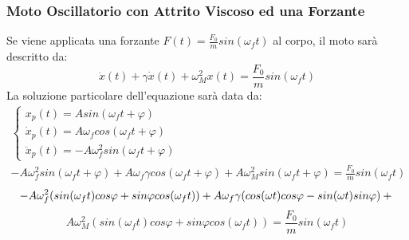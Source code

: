 \documentclass{article}
\numberwithin{equation}{subsection}
\begin{document}
\subsubsection{Moto Oscillatorio con Attrito Viscoso ed una Forzante}
Se viene applicata una forzante $F(t)=\displaystyle\frac{F_0}{m}sin(\omega_f t)$ 
al corpo, il moto sarà descritto da: 
\begin{equation}
    \ddot x(t)+\gamma\dot x(t)+\omega_M^{2}x(t)=\displaystyle\frac{F_0}{m}sin(\omega_f t)
\end{equation}
La soluzione particolare dell'equazione sarà data da:
\begin{gather}
    \begin{cases}
        x_p(t)=Asin(\omega_f t+\varphi)\\
        \dot x_p(t)=A\omega_fcos(\omega_f t+\varphi)\\
        \ddot x_p(t)=-A\omega_f^{2}sin(\omega_f t+\varphi)
    \end{cases}\\
    -A\omega_f^{2}sin(\omega_f t+\varphi)+
    A\omega_f\gamma cos(\omega_f t+\varphi)+
    A\omega_M^{2}sin(\omega_f t+\varphi)=\displaystyle\frac{F_0}{m}sin(\omega_f t)
\end{gather}
\begin{equation}
    -A\omega_f^{2}(sin(\omega_f t)cos\varphi+sin\varphi cos(\omega_f t))+
    A\omega_f\gamma(cos(\omega t)cos\varphi-sin(\omega t)sin\varphi)+\\
\end{equation}
\begin{equation*}
    A\omega_M^{2}(sin(\omega_f t)cos\varphi+sin\varphi cos(\omega_f t))=\displaystyle\frac{F_0}{m}sin(\omega_f t)
\end{equation*}
\end{document}
